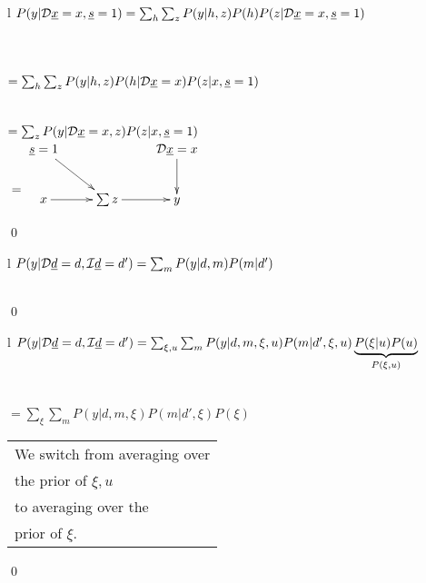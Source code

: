 \begin{longtable}{l}
\color{red}
$P(y|{\cal D}{\underline{x}}=x, {\underline{s}}=1)=
\sum_h
\sum_z P(y|h, z)P(h)
P(z|{\cal D}{\underline{x}}=x, {\underline{s}}=1)$
\\
\\
\\
\\
\color{red}
$=\sum_h\sum_z P(y|h,z)P(h|{\cal D}{\underline{x}}=x)
P(z|x, {\underline{s}}=1)$
\\
\\
\xymatrix{\\=}
\\
\color{red}
$=\sum_z P(y|{\cal D}{\underline{x}}=x, z)P(z|x, {\underline{s}}=1)$
\\
$\xymatrix{\\=}\xymatrix{
\rvs=1\ar[rd]
&&\cald\rvx=x\ar[d]
\\
x\ar[r]
&\sum z\ar[r]
&y
}$
\end{longtable}
\qed

\begin{claim}
\decMediationSimple
\label{cl-decMediationSimple}
\end{claim}
\proof
\begin{longtable}{l}
\color{red}
$P(y|{\cal D}{\underline{d}}=d,{\cal I}{\underline{d}}=d')=
\sum_{m}
P(y|d,m)P(m|d')$
\\
\\
\end{longtable}
\qed

\begin{claim}
\label{cl-decMediationPlus}
\decMediationPlus
\end{claim}
\proof
\begin{longtable}{l}
\color{red}
$P(y|{\cal D}{\underline{d}}=d,{\cal I}{\underline{d}}=d')=
\sum_{\xi, u}
\sum_{m}
P(y|d,m,\xi, u)P(m|d', \xi, u)
\underbrace{P(\xi|u)P(u)}_{P(\xi, u)}$
\\
\\
\\
\color{red}
$=
\sum_{\xi}
\sum_{m}
P(y|d,m,\xi)P(m|d', \xi)
P(\xi)$
\\
\xymatrix{\\=}
\begin{tabular}{l}
We switch from averaging over\\ the
prior of $\xi, u$\\
to averaging over the\\
prior of $\xi$.
\end{tabular}
\end{longtable}
\qed




%
